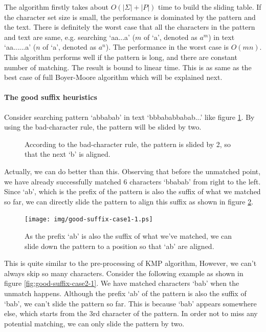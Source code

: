 \documentclass[UTF8]{article}
\begin{document}
The algorithm firstly takes about $O(|\Sigma| + |P|)$ time to build the sliding table. If the character set size is
small, the performance is dominated by the pattern and the text. There is definitely the worst case
that all the characters in the pattern and text are same, e.g. searching `aa...a' ($m$ of `a', denoted as $a^m$)
in text `aa......a' ($n$ of `a', denoted as $a^n$). The performance in
the worst case is $O(mn)$. This algorithm performs well if the pattern is long, and there are constant number of matching. The result is bound to linear time.
This is as same as the best case of full Boyer-Moore algorithm which will be explained next.

\paragraph{The good suffix heuristics}

Consider searching pattern `abbabab' in text `bbbababbabab...' like figure \ref{fig:bad-char-2}. By using the
bad-character rule, the pattern will be slided by two.

\begin{figure}[htbp]
 \centering
 \caption{According to the bad-character rule, the pattern is slided by 2, so that the next `b' is aligned.}
 \label{fig:bad-char-2}
\end{figure}

Actually, we can do better than this. Observing that before the unmatched point, we have already successfully matched 6 characters `bbabab' from right to the left. Since `ab', which is the prefix of the pattern is also the suffix of what we matched so far, we can directly slide the pattern to align this suffix as shown in figure \ref{fig:good-suffix-case1-1}.

\begin{figure}[htbp]
 \centering
 \texttt{[image: img/good-suffix-case1-1.ps]}
 \caption{As the prefix `ab' is also the suffix of what we've matched, we can slide down the pattern to a position so that `ab' are aligned.}
 \label{fig:good-suffix-case1-1}
\end{figure}

This is quite similar to the pre-processing of KMP algorithm, However, we can't always skip
so many characters. Consider the following example as shown in figure \ref{fig:good-suffix-case2-1}. We have matched characters `bab' when the unmatch happens. Although the prefix `ab' of
the pattern is also the suffix of `bab', we can't slide the pattern so far. This is because
`bab' appears somewhere else, which starts from the 3rd character of the pattern. In order
not to miss any potential matching, we can only slide the pattern by two.
\end{document}
